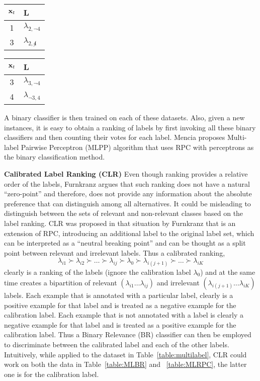 \begin{table}[!htb]
\hfill
\begin{subtable}[]{.16\textwidth}
\centering
\begin{tabular}{c|l}
\toprule
$\mathbf{x}_t$ & L \\
\hline
1 & $\lambda_{2,\lnot4}$\\
3 & $\lambda_{2,\not4}$ \\
\bottomrule
\end{tabular}
\subcaption{}
\end{subtable}
\hfill
\begin{subtable}[]{.16\textwidth}
\centering
\begin{tabular}{c|l}
\toprule
$\mathbf{x}_t$ & L \\
\hline
3 & $\lambda_{3,\lnot4}$\\
4 & $\lambda_{\lnot3,4}$\\
\bottomrule
\end{tabular}
\subcaption{}
\end{subtable}
\end{table}

A binary classifier is then trained on each of these datasets. Also, given a new instances, it is easy to obtain a ranking of labels by first invoking all these binary classifiers and then counting their votes for each label. Mencia\cite{loza2008pairwise} proposes Multi-label Pairwise Perceptron (MLPP) algorithm that uses RPC with perceptrons as the binary classification method.

\textbf{Calibrated Label Ranking (CLR)} Even though ranking provides a relative order of the labels, Furnkranz\cite{loza2008pairwise} argues that such ranking does not have a natural ``zero-point'' and therefore, does not provide any information about the absolute preference that can distinguish among all alternatives. It could be misleading to distinguish between the sets of relevant and non-relevant classes based on the label ranking. CLR was proposed in that situation by Furnkranz that is an extension of RPC, introducing an additional label to the original label set, which can be interpreted as a ``neutral breaking point'' and can be thought as a split point between relevant and irrelevant labels. Thus a calibrated ranking,
\[\lambda_{i1}\succ\lambda_{i2}\succ\dots\succ\lambda_{ij}\succ\lambda_0\succ \lambda_{i(j+1)}\succ\dots\succ\lambda_{iK}\]
clearly is a ranking of the labels (ignore the calibration label $\lambda_0$) and at the same time creates a bipartition of relevant $(\lambda_{i1}\dots\lambda_{ij})$ and irrelevant $(\lambda_{i(j+1)}\dots \lambda_{iK})$ labels. Each example that is annotated with a particular label, clearly is a positive example for that label and is treated as a negative example for the calibration label. Each example that is not annotated with a label is clearly a negative example for that label and is treated as a positive example for the calibration label. Thus a Binary Relevance (BR) classifier can then be employed to discriminate between the calibrated label and each of the other labels. Intuitively, while applied to the dataset in Table~\ref{table:multilabel}, CLR could work on both the data in Table~\ref{table:MLBR} and ~\ref{table:MLRPC}, the latter one is for the calibration label.